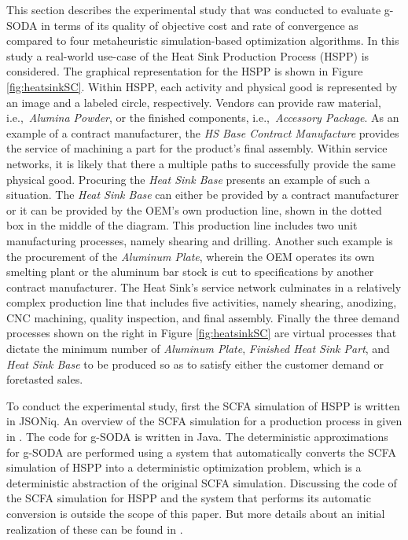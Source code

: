 \documentclass[a4paper, 12pt]{article} %
\begin{document}
This section describes the experimental study that was conducted to evaluate g-SODA in terms of its quality of objective cost and rate of convergence as compared to four metaheuristic simulation-based optimization algorithms. 
In this study a real-world use-case of the Heat Sink Production Process (HSPP) is considered.
The graphical representation for the HSPP  is shown in Figure \ref{fig:heatsinkSC}.
Within HSPP, each activity and physical good is represented by an image and a labeled circle, respectively.  Vendors can provide raw material, i.e.,\ \textit{Alumina Powder}, or the finished components, i.e.,\ \textit{Accessory Package}.  As an example of a contract manufacturer, the \textit{HS Base Contract Manufacture} provides the service of machining a part for the product's final assembly.  Within service networks, it is likely that there a multiple paths to successfully provide the same physical good. Procuring the \textit{Heat Sink Base} presents an example of such a situation.  The \textit{Heat Sink Base} can either be provided by a contract manufacturer or it can be provided by the OEM's own production line, shown in the dotted box in the middle of the diagram.  This production line includes two unit manufacturing processes, namely shearing and drilling.  Another such example is the procurement of the \textit{Aluminum Plate}, wherein the OEM operates its own smelting plant or the aluminum bar stock is cut to specifications by another contract manufacturer. The Heat Sink's service network culminates in a relatively complex production line that includes five activities, namely shearing, anodizing, CNC machining, quality inspection, and final assembly. 
Finally the three demand processes shown on the right in Figure \ref{fig:heatsinkSC} are virtual processes that dictate the minimum number of \textit{Aluminum Plate}, \textit{Finished Heat Sink Part}, and \textit{Heat Sink Base} to be produced so as to satisfy either the customer demand or foretasted sales. 

To conduct the experimental study, first the SCFA simulation of HSPP is written in JSONiq. An overview of the SCFA simulation for a production process in given in \cite{GMU-CS-TR-2017-3}.  The code for g-SODA is written in Java. The deterministic approximations for g-SODA are performed using a system that automatically converts the SCFA simulation of HSPP into a deterministic optimization problem, which is a deterministic abstraction of the original SCFA simulation. Discussing the code of the SCFA simulation for HSPP and the system that performs its automatic conversion is outside the scope of this paper. But more details about an initial realization of these can be found in \cite{Brodsky2016ieeebd,Brodsky2017ieeebd}.
\end{document}
